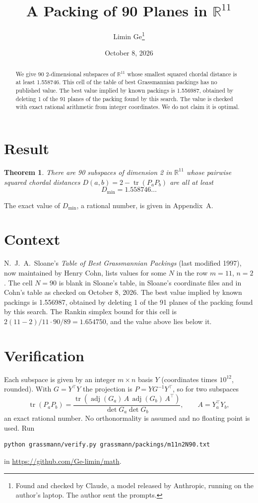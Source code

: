 \documentclass[11pt,a4paper]{article}
\title{A Packing of 90 Planes in $\mathbb{R}^{11}$}
\author{Limin Ge\thanks{Found and checked by Claude, a model released by Anthropic, running on the author's laptop. The author sent the prompts.}}
\date{October 8, 2026}
\newtheorem*{theorem}{Theorem}
\begin{document}
\maketitle
\begin{abstract}
We give 90 2-dimensional subspaces of $\mathbb{R}^{11}$ whose smallest squared chordal distance is at least 1.558746. This cell of the table of best Grassmannian packings has no published value. The best value implied by known packings is 1.556987, obtained by deleting 1 of the 91 planes of the packing found by this search. The value is checked with exact rational arithmetic from integer coordinates. We do not claim it is optimal.
\end{abstract}

\section{Result}
\begin{theorem}
There are 90 subspaces of dimension 2 in $\mathbb{R}^{11}$ whose pairwise squared chordal distances $D(a,b) = 2 - \operatorname{tr}(P_aP_b)$ are all at least
\[ D_{\min} = 1.558746\ldots \]
\end{theorem}
The exact value of $D_{\min}$, a rational number, is given in Appendix~A.


\section{Context}
N.~J.~A.~Sloane's \emph{Table of Best Grassmannian Packings} (last modified 1997), now maintained by Henry Cohn, lists values for some $N$ in the row $m=11$, $n=2$. The cell $N=90$ is blank in Sloane's table, in Sloane's coordinate files and in Cohn's table as checked on October 8, 2026. The best value implied by known packings is 1.556987, obtained by deleting 1 of the 91 planes of the packing found by this search. The Rankin simplex bound for this cell is $2(11-2)/11\cdot 90/89 = 1.654750$, and the value above lies below it.


\section{Verification}
Each subspace is given by an integer $m\times n$ basis $Y$ (coordinates times $10^{12}$, rounded). With $G=Y^\top Y$ the projection is $P=YG^{-1}Y^\top$, so for two subspaces
\[ \operatorname{tr}(P_aP_b)=\frac{\operatorname{tr}(\operatorname{adj}(G_a)\,A\,\operatorname{adj}(G_b)\,A^\top)}{\det G_a\det G_b},\qquad A=Y_a^\top Y_b, \]
an exact rational number. No orthonormality is assumed and no floating point is used. Run
\begin{verbatim}
python grassmann/verify.py grassmann/packings/m11n2N90.txt
\end{verbatim}
in \url{https://github.com/Ge-limin/math}.
\end{document}
